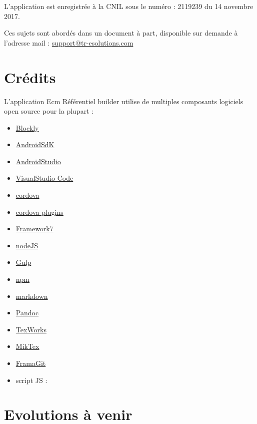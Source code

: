 \documentclass[oneside]{book}
\begin{document}
L'application est enregistrée à la CNIL sous le numéro :
2119239 du 14 novembre 2017.

Ces sujets sont abordés dans un document à part, disponible sur demande
à l'adresse mail : \url{support@tr-esolutions.com}

\hypertarget{cruxe9dits}{%
\section{\texorpdfstring{Crédits}{Crédits}}\label{cruxe9dits}}

L'application Ecm Référentiel builder utilise de multiples composants
logiciels open source pour la plupart :

\begin{itemize}
\item
  \href{}{Blockly}
\item
  \href{https://developer.android.com/studio/index.html}{AndroidSdK}
\item
  \href{https://developer.android.com/studio/index.html}{AndroidStudio}
\item
  \href{https://code.visualstudio.com/}{VisualStudio Code}
\item
  \href{https://cordova.apache.org/}{cordova}
\item
  \href{https://cordova.apache.org/plugins/}{cordova plugins}
\item
  \href{https://framework7.io/}{Framework7}
\item
  \href{https://nodejs.org/}{nodeJS}
\item
  \href{https://gulpjs.com/}{Gulp}
\item
  \href{https://www.npmjs.com/}{npm}
\item
  \href{https://en.wikipedia.org/wiki/Markdown}{markdown}
\item
  \href{https://pandoc.org/}{Pandoc}
\item
  \href{https://www.tug.org/texworks/}{TexWorks}
\item
  \href{https://miktex.org/}{MikTex}
\item
  \href{https://framagit.org/}{FramaGit}
\item
  script JS :
\end{itemize}

\hypertarget{evolutions-uxe0-venir}{%
\section{\texorpdfstring{Evolutions à
venir}{Evolutions à venir}}\label{evolutions-uxe0-venir}}
\end{document}
